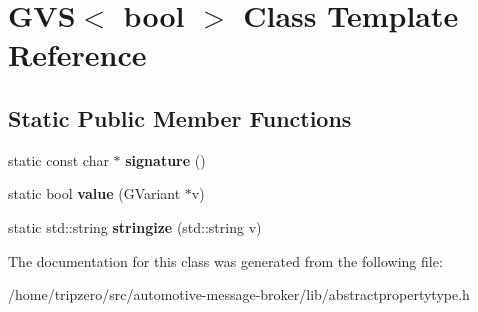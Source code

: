 \hypertarget{classGVS_3_01bool_01_4}{\section{G\-V\-S$<$ bool $>$ Class Template Reference}
\label{classGVS_3_01bool_01_4}
}
\subsection*{Static Public Member Functions}
\begin{DoxyCompactItemize}
\item 
\hypertarget{classGVS_3_01bool_01_4_a81cb01e07ccf7830cce75abcc4a2cca8}{static const char $\ast$ {\bfseries signature} ()}\label{classGVS_3_01bool_01_4_a81cb01e07ccf7830cce75abcc4a2cca8}

\item 
\hypertarget{classGVS_3_01bool_01_4_affd787db6c549ec8bee51862fc51f211}{static bool {\bfseries value} (G\-Variant $\ast$v)}\label{classGVS_3_01bool_01_4_affd787db6c549ec8bee51862fc51f211}

\item 
\hypertarget{classGVS_3_01bool_01_4_a3f5e4da1a15517ae3e700c3a1b70fea7}{static std\-::string {\bfseries stringize} (std\-::string v)}\label{classGVS_3_01bool_01_4_a3f5e4da1a15517ae3e700c3a1b70fea7}

\end{DoxyCompactItemize}


The documentation for this class was generated from the following file\-:\begin{DoxyCompactItemize}
\item 
/home/tripzero/src/automotive-\/message-\/broker/lib/abstractpropertytype.\-h\end{DoxyCompactItemize}
